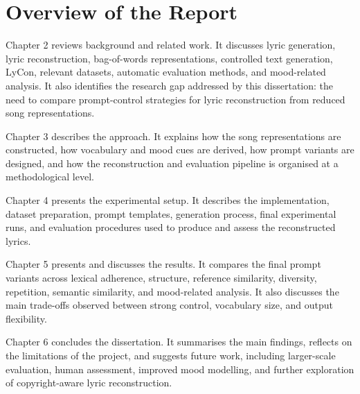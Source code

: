 \section{Overview of the Report}

Chapter 2 reviews background and related work. It discusses lyric generation, lyric reconstruction, bag-of-words representations, controlled text generation, LyCon, relevant datasets, automatic evaluation methods, and mood-related analysis. It also identifies the research gap addressed by this dissertation: the need to compare prompt-control strategies for lyric reconstruction from reduced song representations.

Chapter 3 describes the approach. It explains how the song representations are constructed, how vocabulary and mood cues are derived, how prompt variants are designed, and how the reconstruction and evaluation pipeline is organised at a methodological level.

Chapter 4 presents the experimental setup. It describes the implementation, dataset preparation, prompt templates, generation process, final experimental runs, and evaluation procedures used to produce and assess the reconstructed lyrics.

Chapter 5 presents and discusses the results. It compares the final prompt variants across lexical adherence, structure, reference similarity, diversity, repetition, semantic similarity, and mood-related analysis. It also discusses the main trade-offs observed between strong control, vocabulary size, and output flexibility.

Chapter 6 concludes the dissertation. It summarises the main findings, reflects on the limitations of the project, and suggests future work, including larger-scale evaluation, human assessment, improved mood modelling, and further exploration of copyright-aware lyric reconstruction.
